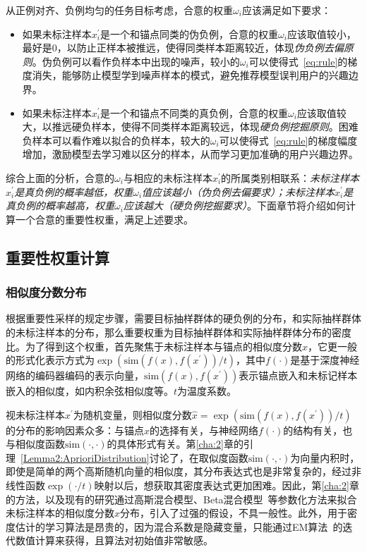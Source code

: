 从正例对齐、负例均匀的任务目标考虑，合意的权重$\omega_i$应该满足如下要求：
\begin{itemize}
\item 如果未标注样本$x_i^\prime$是一个和锚点同类的伪负例，合意的权重$\omega_i$应该取值较小，最好是0，以防止正样本被推远，使得同类样本距离较近，体现\textit{伪负例去偏原则}。伪负例可以看作负样本中出现的噪声，较小的$\omega_i$可以使得式~\eqref{eq:rule}的梯度消失，能够防止模型学到噪声样本的模式，避免推荐模型误判用户的兴趣边界。
\item 如果未标注样本$x_i^\prime$是一个和锚点不同类的真负例，合意的权重$\omega_i$应该取值较大，以推远硬负样本，使得不同类样本距离较远，体现\textit{硬负例挖掘原则}。困难负样本可以看作难以拟合的负样本，较大的$\omega_i$可以使得式~\eqref{eq:rule}的梯度幅度增加，激励模型去学习难以区分的样本，从而学习更加准确的用户兴趣边界。
\end{itemize}

综合上面的分析，合意的$\omega_i$与相应的未标注样本$x^\prime_i$的所属类别相联系：\textit{未标注样本$x^\prime_i$是真负例的概率越低，权重$\omega_i$值应该越小（伪负例去偏要求）；未标注样本$x^\prime_i$是真负例的概率越高，权重$\omega_i$应该越大（硬负例挖掘要求）}。下面章节将介绍如何计算一个合意的重要性权重，满足上述要求。

\subsection{重要性权重计算}
\subsubsection{相似度分数分布}
根据重要性采样的规定步骤，需要目标抽样群体的硬负例的分布，和实际抽样群体的未标注样本的分布，那么重要权重为目标抽样群体和实际抽样群体分布的密度比。为了得到这个权重，首先聚焦于未标注样本与锚点的相似度分数$\hat{x}$，它更一般的形式化表示方式为$\exp(\text{sim}(f(x),f(x^\prime))/t)$，其中$f(\cdot)$是基于深度神经网络的编码器编码的表示向量，$\text{sim}(f(x),f(x^\prime))$表示锚点嵌入和未标记样本嵌入的相似度，如内积余弦相似度等。$t$为温度系数。

视未标注样本$x^\prime$为随机变量，则相似度分数$\hat{x} = \exp(\text{sim}(f(x),f(x^\prime))/t)$的分布的影响因素众多：与锚点$x$的选择有关，与神经网络$f(\cdot)$的结构有关，也与相似度函数$\text{sim}(\cdot,\cdot)$的具体形式有关。第\ref{cha:2}章的引理~\ref{Lemma2:AprioriDistribution}讨论了，在取似度函数$\text{sim}(\cdot,\cdot)$为向量内积时，即使是简单的两个高斯随机向量的相似度，其分布表达式也是非常复杂的，经过非线性函数$\exp(\cdot/t)$映射以后，想获取其密度表达式更加困难。因此，第\ref{cha:2}章的方法，以及现有的研究\cite{Xia:2022:ICML}通过高斯混合模型\cite{Lindsay:1995}、Beta混合模型~\cite{Xia:2022:ICML}等参数化方法来拟合未标注样本的相似度分数$\hat{x}$分布，引入了过强的假设，不具一般性。此外，用于密度估计的学习算法是昂贵的，因为混合系数是隐藏变量，只能通过EM算法~\cite{Dempster:1977:RSS}的迭代数值计算来获得，且算法对初始值非常敏感。

